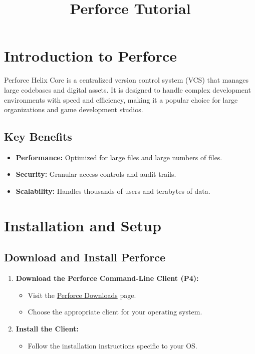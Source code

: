 \documentclass{article}
\begin{document}
\title{Perforce Tutorial}
\author{}
\date{}

\maketitle

\tableofcontents

\section{Introduction to Perforce}

Perforce Helix Core is a centralized version control system (VCS) that manages large codebases and digital assets. It is designed to handle complex development environments with speed and efficiency, making it a popular choice for large organizations and game development studios.

\subsection*{Key Benefits}

\begin{itemize}
    \item \textbf{Performance:} Optimized for large files and large numbers of files.
    \item \textbf{Security:} Granular access controls and audit trails.
    \item \textbf{Scalability:} Handles thousands of users and terabytes of data.
\end{itemize}

\section{Installation and Setup}

\subsection{Download and Install Perforce}

\begin{enumerate}
    \item \textbf{Download the Perforce Command-Line Client (P4):}
    \begin{itemize}
        \item Visit the \href{https://www.perforce.com/downloads}{Perforce Downloads} page.
        \item Choose the appropriate client for your operating system.
    \end{itemize}
    \item \textbf{Install the Client:}
    \begin{itemize}
        \item Follow the installation instructions specific to your OS.
    \end{itemize}
\end{enumerate}
\end{document}

